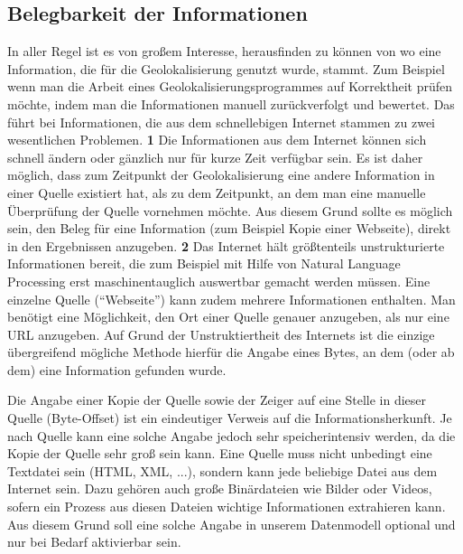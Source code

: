 \subsection{Belegbarkeit der Informationen}
In aller Regel ist es von großem Interesse, herausfinden zu können von wo eine Information, die für die Geolokalisierung genutzt wurde, stammt. Zum Beispiel wenn man die Arbeit eines Geolokalisierungsprogrammes auf Korrektheit prüfen möchte, indem man die Informationen manuell zurückverfolgt und bewertet. Das führt bei Informationen, die aus dem schnellebigen Internet stammen zu zwei wesentlichen Problemen. \textbf{1} Die Informationen aus dem Internet können sich schnell ändern oder gänzlich nur für kurze Zeit verfügbar sein. Es ist daher möglich, dass zum Zeitpunkt der Geolokalisierung eine andere Information in einer Quelle existiert hat, als zu dem Zeitpunkt, an dem man eine manuelle Überprüfung der Quelle vornehmen möchte. Aus diesem Grund sollte es möglich sein, den Beleg für eine Information (zum Beispiel Kopie einer Webseite), direkt in den Ergebnissen anzugeben. \textbf{2} Das Internet hält größtenteils unstrukturierte Informationen bereit, die zum Beispiel mit Hilfe von Natural Language Processing erst maschinentauglich auswertbar gemacht werden müssen. Eine einzelne Quelle (``Webseite'') kann zudem mehrere Informationen enthalten. Man benötigt eine Möglichkeit, den Ort einer Quelle genauer anzugeben, als nur eine URL anzugeben. Auf Grund der Unstruktiertheit des Internets ist die einzige übergreifend mögliche Methode hierfür die Angabe eines Bytes, an dem (oder ab dem) eine Information gefunden wurde.

Die Angabe einer Kopie der Quelle sowie der Zeiger auf eine Stelle in dieser Quelle (Byte-Offset) ist ein eindeutiger Verweis auf die Informationsherkunft. Je nach Quelle kann eine solche Angabe jedoch sehr speicherintensiv werden, da die Kopie der Quelle sehr groß sein kann. Eine Quelle muss nicht unbedingt eine Textdatei sein (HTML, XML, ...), sondern kann jede beliebige Datei aus dem Internet sein. Dazu gehören auch große Binärdateien wie Bilder oder Videos, sofern ein Prozess aus diesen Dateien wichtige Informationen extrahieren kann. Aus diesem Grund soll eine solche Angabe in unserem Datenmodell optional und nur bei Bedarf aktivierbar sein.

